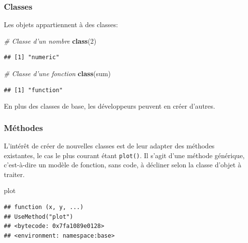 \documentclass[
  12pt,
  french,
  a4paper,
  extrafontsizes,onecolumn,openright
  ]{memoir}
\newenvironment{Shaded}{\begin{snugshade}}{\end{snugshade}}
\newcommand{\CommentTok}[1]{\textcolor[rgb]{0.56,0.35,0.01}{\textit{#1}}}
\newcommand{\DecValTok}[1]{\textcolor[rgb]{0.00,0.00,0.81}{#1}}
\newcommand{\KeywordTok}[1]{\textcolor[rgb]{0.13,0.29,0.53}{\textbf{#1}}}
\newcommand{\NormalTok}[1]{#1}
\begin{document}
\hypertarget{classes}{%
\subsubsection{Classes}\label{classes}}

Les objets appartiennent à des classes:

\scriptsize

\begin{Shaded}
\begin{Highlighting}[]
\CommentTok{# Classe d'un nombre}
\KeywordTok{class}\NormalTok{(}\DecValTok{2}\NormalTok{)}
\end{Highlighting}
\end{Shaded}

\begin{verbatim}
## [1] "numeric"
\end{verbatim}

\begin{Shaded}
\begin{Highlighting}[]
\CommentTok{# Classe d'une fonction}
\KeywordTok{class}\NormalTok{(sum)}
\end{Highlighting}
\end{Shaded}

\begin{verbatim}
## [1] "function"
\end{verbatim}

\normalsize

En plus des classes de base, les développeurs peuvent en créer d'autres.

\hypertarget{muxe9thodes}{%
\subsubsection{Méthodes}\label{muxe9thodes}}

L'intérêt de créer de nouvelles classes est de leur adapter des méthodes existantes, le cas le plus courant étant \texttt{plot()}.
Il s'agit d'une méthode générique, c'est-à-dire un modèle de fonction, sans code, à décliner selon la classe d'objet à traiter.

\scriptsize

\begin{Shaded}
\begin{Highlighting}[]
\NormalTok{plot}
\end{Highlighting}
\end{Shaded}

\begin{verbatim}
## function (x, y, ...) 
## UseMethod("plot")
## <bytecode: 0x7fa1089e0128>
## <environment: namespace:base>
\end{verbatim}
\end{document}
